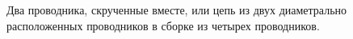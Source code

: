 Два проводника, скрученные вместе, или цепь из двух диаметрально расположенных
проводников в сборке из четырех проводников. 